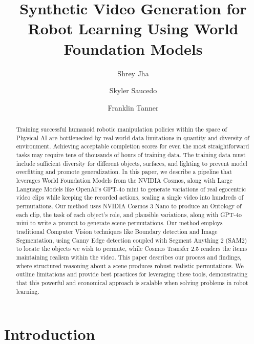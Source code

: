 \documentclass[runningheads]{llncs}
\begin{document}
\title{Synthetic Video Generation for Robot Learning Using World Foundation Models}

\author{Shrey Jha \and
Skyler Saucedo \and
Franklin Tanner}


\maketitle

\begin{abstract}
Training successful humanoid robotic manipulation policies within the space of Physical AI are bottlenecked by real-world data limitations in quantity and diversity of environment. Achieving acceptable completion scores for even the most straightforward tasks may require tens of thousands of hours of training data. The training data must include sufficient diversity for different objects, surfaces, and lighting to prevent model overfitting and promote generalization. In this paper, we describe a pipeline that leverages World Foundation Models from the NVIDIA Cosmos, along with Large Language Models like OpenAI's GPT-4o mini to generate variations of real egocentric video clips while keeping the recorded actions, scaling a single video into hundreds of permutations. Our method uses NVIDIA Cosmos 3 Nano to produce an Ontology of each clip, the task of each object's role, and plausible variations, along with GPT-4o mini to write a prompt to generate scene permutations. Our method employs traditional Computer Vision techniques like Boundary detection and Image Segmentation, using Canny Edge detection coupled with Segment Anything 2 (SAM2) to locate the objects we wish to permute, while Cosmos Transfer 2.5 renders the items maintaining realism within the video. This paper describes our process and findings, where structured reasoning about a scene produces robust realistic permutations. We outline limitations and provide best practices for leveraging these tools, demonstrating that this powerful and economical approach is scalable when solving problems in robot learning.
\end{abstract}

\section{Introduction}
\end{document}
